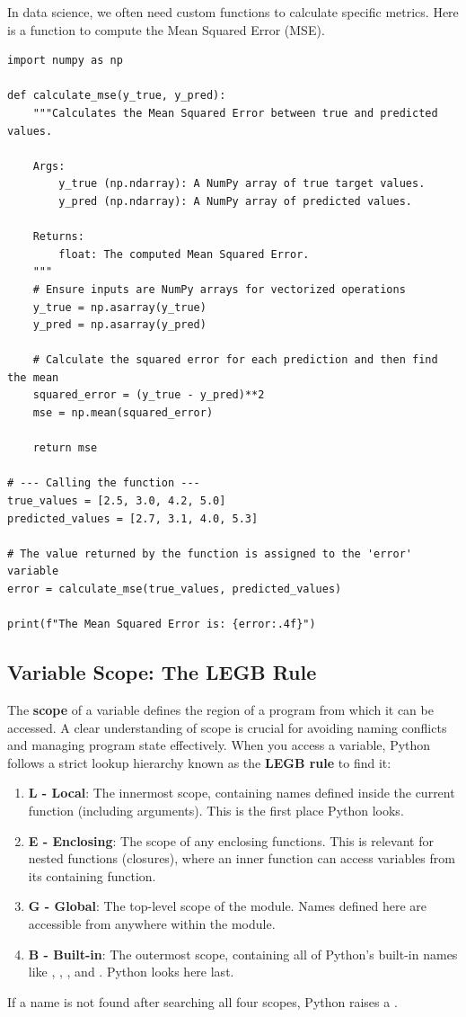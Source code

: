 \begin{example}
In data science, we often need custom functions to calculate specific metrics. Here is a function to compute the Mean Squared Error (MSE).
\text{ }\begin{verbatim}
import numpy as np

def calculate_mse(y_true, y_pred):
    """Calculates the Mean Squared Error between true and predicted values.

    Args:
        y_true (np.ndarray): A NumPy array of true target values.
        y_pred (np.ndarray): A NumPy array of predicted values.

    Returns:
        float: The computed Mean Squared Error.
    """
    # Ensure inputs are NumPy arrays for vectorized operations
    y_true = np.asarray(y_true)
    y_pred = np.asarray(y_pred)
    
    # Calculate the squared error for each prediction and then find the mean
    squared_error = (y_true - y_pred)**2
    mse = np.mean(squared_error)
    
    return mse

# --- Calling the function ---
true_values = [2.5, 3.0, 4.2, 5.0]
predicted_values = [2.7, 3.1, 4.0, 5.3]

# The value returned by the function is assigned to the 'error' variable
error = calculate_mse(true_values, predicted_values)

print(f"The Mean Squared Error is: {error:.4f}")
\end{verbatim}
\end{example}

\subsection{Variable Scope: The LEGB Rule}
\label{subsec:scope}
The \textbf{scope} of a variable defines the region of a program from which it can be accessed. A clear understanding of scope is crucial for avoiding naming conflicts and managing program state effectively. When you access a variable, Python follows a strict lookup hierarchy known as the \textbf{LEGB rule} to find it:

\begin{enumerate}
    \item \textbf{L - Local}: The innermost scope, containing names defined inside the current function (including arguments). This is the first place Python looks.
    \item \textbf{E - Enclosing}: The scope of any enclosing functions. This is relevant for nested functions (closures), where an inner function can access variables from its containing function.
    \item \textbf{G - Global}: The top-level scope of the module. Names defined here are accessible from anywhere within the module.
    \item \textbf{B - Built-in}: The outermost scope, containing all of Python's built-in names like , , , and . Python looks here last.
\end{enumerate}
If a name is not found after searching all four scopes, Python raises a .


